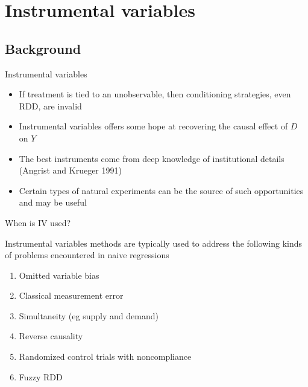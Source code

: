 \documentclass{beamer}
\begin{document}



\section{Instrumental variables}

\subsection{Background}

\begin{frame}{Instrumental variables}

  \begin{itemize}
    \item If treatment is tied to an unobservable, then conditioning strategies, even RDD, are invalid
    \item Instrumental variables offers some hope at recovering the causal effect of $D$ on $Y$
    \item The best instruments come from deep knowledge of institutional details (Angrist and Krueger 1991)
    \item Certain types of natural experiments can be the source of such opportunities and may be useful
  \end{itemize}

\end{frame}


\begin{frame}{When is IV used?}

  Instrumental variables methods are typically used to address the following kinds of problems encountered in naive regressions
  \begin{enumerate}
    \item Omitted variable bias
    \item Classical measurement error
    \item Simultaneity (eg supply and demand)
    \item Reverse causality
    \item Randomized control trials with noncompliance
    \item Fuzzy RDD
  \end{enumerate}


\end{frame}
\end{document}
